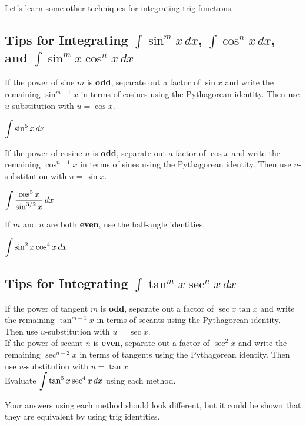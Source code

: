 \documentclass[12pt]{article}
\begin{document}
\vfill

Let's learn some other techniques for integrating trig functions.

\newpage

\subsection*{Tips for Integrating $\int\sin^m x\,dx$, $\int\cos^nx\,dx$, and $\int\sin^m x\cos^n x\,dx$}

If the power of sine $m$ is \textbf{odd}, separate out a factor of $\sin x$ and write the remaining $\sin^{m-1}x$ in terms of cosines using the Pythagorean identity. Then use $u$-substitution with $u=\cos x$.

\Example $\displaystyle\int\sin^5 x\,dx$

\vfill

If the power of cosine $n$ is \textbf{odd}, separate out a factor of $\cos x$ and write the remaining $\cos^{n-1}x$ in terms of sines using the Pythagorean identity. Then use $u$-substitution with $u=\sin x$.

\Example $\displaystyle\int\frac{\cos^5 x}{\sin^{3/2}x}\,dx$

\vfill

\newpage

If $m$ and $n$ are both \textbf{even}, use the half-angle identities.

\Example $\displaystyle\int\sin^2x\cos^4x\,dx$

\newpage

\subsection*{Tips for Integrating $\int\tan^m x\sec^nx\,dx$}
%
If the power of tangent $m$ is \textbf{odd}, separate out a factor of $\sec x\tan x$ and write the remaining $\tan^{m-1}x$ in terms of secants using the Pythagorean identity. Then use $u$-substitution with $u=\sec x$.\\

If the power of secant $n$ is \textbf{even}, separate out a factor of $\sec^2x$ and write the remaining $\sec^{n-2}x$ in terms of tangents using the Pythagorean identity. Then use $u$-substitution with $u=\tan x$. \\

\Example Evaluate $\displaystyle\int\tan^5 x\sec^4x\,dx$ using each method.

\vfill

Your answers using each method should look different, but it could be shown that they are equivalent by using trig identities.
\end{document}
